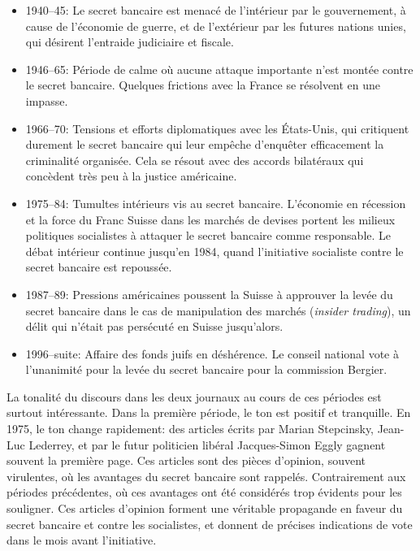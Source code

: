 \documentclass[a4paper, 11pt]{article}
\begin{document}
\begin{itemize}
\item
  1940--45: Le secret bancaire est menacé de l'intérieur par le
  gouvernement, à cause de l'économie de guerre, et de l'extérieur par
  les futures nations unies, qui désirent l'entraide judiciaire et
  fiscale.
\item
  1946--65: Période de calme où aucune attaque importante n'est montée
  contre le secret bancaire. Quelques frictions avec la France se
  résolvent en une impasse.
\item
  1966--70: Tensions et efforts diplomatiques avec les États-Unis, qui
  critiquent durement le secret bancaire qui leur empêche d'enquêter
  efficacement la criminalité organisée. Cela se résout avec des accords
  bilatéraux qui concèdent très peu à la justice américaine.
\item
  1975--84: Tumultes intérieurs vis au secret bancaire. L'économie en
  récession et la force du Franc Suisse dans les marchés de devises
  portent les milieux politiques socialistes à attaquer le secret
  bancaire comme responsable. Le débat intérieur continue jusqu'en 1984,
  quand l'initiative socialiste contre le secret bancaire est repoussée.
\item
  1987--89: Pressions américaines poussent la Suisse à approuver la
  levée du secret bancaire dans le cas de manipulation des marchés
  (\emph{insider trading}), un délit qui n'était pas persécuté en Suisse
  jusqu'alors.
\item
  1996--suite: Affaire des fonds juifs en déshérence. Le conseil
  national vote à l'unanimité pour la levée du secret bancaire pour la
  commission Bergier.
\end{itemize}

La tonalité du discours dans les deux journaux au cours de ces périodes
est surtout intéressante. Dans la première période, le ton est positif
et tranquille. En 1975, le ton change rapidement: des articles écrits
par Marian Stepcinsky, Jean-Luc Lederrey, et par le futur politicien
libéral Jacques-Simon Eggly gagnent souvent la première page. Ces
articles sont des pièces d'opinion, souvent virulentes, où les avantages
du secret bancaire sont rappelés. Contrairement aux périodes
précédentes, où ces avantages ont été considérés trop évidents pour les
souligner. Ces articles d'opinion forment une véritable propagande en
faveur du secret bancaire et contre les socialistes, et donnent de
précises indications de vote dans le mois avant l'initiative.
\end{document}
